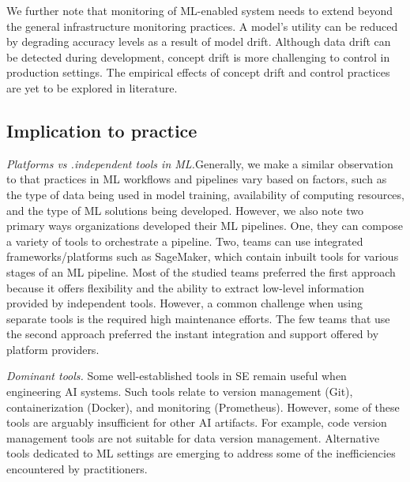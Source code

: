 We further note that monitoring of ML-enabled system needs to extend beyond the general infrastructure monitoring practices. A model's utility can be reduced by degrading accuracy levels as a result of model drift. Although data drift can be detected during development, concept drift is more challenging to control in production settings. The empirical effects of concept drift and control practices are yet to be explored in literature.


\subsection{Implication to practice}
\textit{Platforms vs .independent tools in ML.}Generally, we make a similar observation to \cite{Doris2021MLPipelines} that practices in ML workflows and pipelines vary based on factors, such as the type of data being used in model training, availability of computing resources, and the type of ML solutions being developed. However, we also note two primary ways organizations developed their ML pipelines. One, they can compose a variety of tools to orchestrate a pipeline. Two, teams can use integrated frameworks/platforms such as SageMaker, which contain inbuilt tools for various stages of an ML pipeline. Most of the studied teams preferred the first approach because it offers flexibility and the ability to extract low-level information provided by independent tools. However, a common challenge when using separate tools is the required high maintenance efforts. The few teams that use the second approach preferred the instant integration and support offered by platform providers.

\textit{Dominant tools.} Some well-established tools in SE remain useful when engineering AI systems. Such tools relate to version management (Git), containerization (Docker), and monitoring (Prometheus). However, some of these tools are arguably insufficient for other AI artifacts. For example, code version management tools are not suitable for data version management. Alternative tools dedicated to ML settings are emerging to address some of the inefficiencies encountered by practitioners. %

